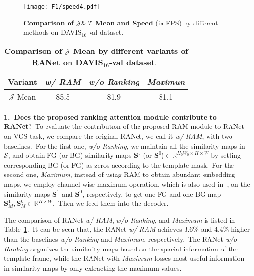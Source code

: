 \documentclass[10pt,twocolumn,letterpaper]{article}
\begin{document}
\begin{figure}[t]\vspace{-4mm}
\begin{center}
\texttt{[image: F1/speed4.pdf]}
\end{center}
\vspace{-6mm}
\caption{\textbf{Comparison of $\mathcal{J}\&\mathcal{F}$ Mean and Speed} (in FPS) by different methods on DAVIS$_{16}$-val dataset.}
\vspace{-2mm}
\label{fig:speed}
\end{figure}
\begin{table}[t]
  \centering
    \begin{tabular}{c||ccc}
    \Xhline{1pt}
    \rowcolor[rgb]{ .873,  .91,  0.95} 
Variant
    & \multicolumn{1}{l}{\emph{w/ RAM}} 
    & \multicolumn{1}{l}{\emph{w/o Ranking}}
    & \multicolumn{1}{l}{\emph{Maximun}} 
\\
    \hline
$\mathcal{J}$ Mean & 85.5 &   81.9   & 81.1 
\\
\hline
    \end{tabular}\vspace{-3mm}
    \caption{\textbf{Comparison of $\mathcal{J}$ Mean by different variants of RANet on DAVIS$_{16}$-val dataset}.\ 
}
    \vspace{-4mm}
  \label{tab:ram}\end{table}

\noindent
\textbf{1.\ Does the proposed ranking attention module contribute to RANet}?\
To evaluate the contribution of the proposed RAM module to RANet on VOS task, we compare the original RANet, we call it \emph{w/ RAM}, with two baselines.\ For the first one, \emph{w/o Ranking}, we maintain all the similarity maps in $\mathcal{S}$, and obtain FG (or BG) similarity maps $\mathbf{S}^1$ (or $\mathbf{S}^0$)$\in$$\mathbb{R}^{H_0W_0\times H\times W}$ by setting corresponding BG (or FG) as zeros according to the template mask.\ For the second one, \emph{Maximum}, instead of using RAM to obtain abundant embedding maps, we employ channel-wise maximum operation, which is also used in~\cite{Voigtlaender2019FEELVOS}, on the similarity maps $\mathbf{S}^1$ and $\mathbf{S}^0$, respectively, to get one FG and one BG map $\mathbf{S}^1_M,\mathbf{S}^0_M\in\mathbb{R}^{H\times W}$.\ Then we feed them into the decoder.\ 

The comparison of RANet \emph{w/ RAM}, \emph{w/o Ranking}, and \emph{Maximum} is listed in Table~\ref{tab:ram}.\ It can be seen that, the RANet \emph{w/ RAM} achieves $3.6\%$ and $4.4\%$ higher than the baselines \emph{w/o Ranking} and \emph{Maximum}, respectively.\ The RANet \emph{w/o Ranking} organizes the similarity maps based on the spacial information of the template frame, while the RANet with \emph{Maximum} losses most useful information in similarity maps by only extracting the maximum values.
\end{document}
